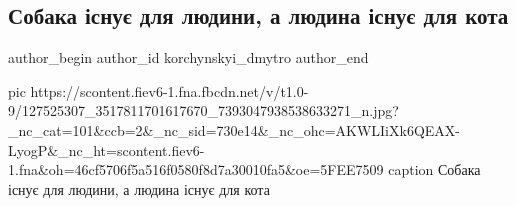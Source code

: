  
 
 
 
 
 
\subsection{Собака існує для людини, а людина існує для кота}
\label{sec:26_11_2020.fb.korchynskyi_dmytro.1.sobaka_kit}
\ifcmt
	author_begin
   author_id korchynskyi_dmytro
	author_end
\fi

\ifcmt
pic https://scontent.fiev6-1.fna.fbcdn.net/v/t1.0-9/127525307_3517811701617670_7393047938538633271_n.jpg?_nc_cat=101&ccb=2&_nc_sid=730e14&_nc_ohc=AKWLIiXk6QEAX-LyogP&_nc_ht=scontent.fiev6-1.fna&oh=46cf5706f5a516f0580f8d7a30010fa5&oe=5FEE7509
caption Собака існує для людини, а людина існує для кота
\fi
